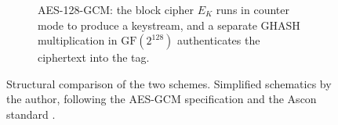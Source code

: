 \begin{figure}[tb]
\begin{subfigure}{\textwidth}
    \caption{AES-128-GCM: the block cipher $E_K$ runs in counter mode to produce
      a keystream, and a separate GHASH multiplication in $\mathrm{GF}(2^{128})$
      authenticates the ciphertext into the tag.}
    \label{fig:scheme-gcm}
  \end{subfigure}

  \caption{Structural comparison of the two schemes. Simplified schematics by the
  author, following the AES-GCM specification \cite{FIPS197,NISTSP80038D} and the
  Ascon standard \cite{NISTSP800232,ASCONSpec}.}
  \label{fig:scheme-comparison}
\end{figure}

